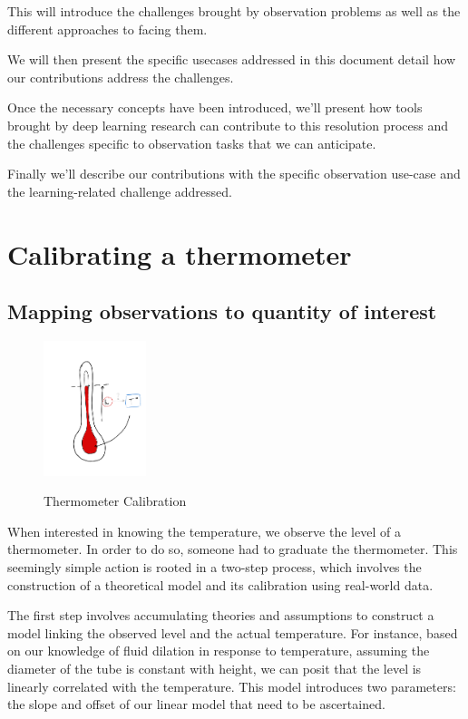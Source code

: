 \begin{bibunit}
  This will introduce the challenges brought by observation problems as well as the different approaches to facing them.

  We will then present the specific usecases addressed in this document detail how our contributions address the challenges.

  Once the necessary concepts have been introduced, we'll present how tools brought by deep learning research can contribute to this resolution process and the challenges specific to observation tasks that we can anticipate.

  Finally we'll describe our contributions with the specific observation use-case and the learning-related challenge addressed. 
  
  \section{Calibrating a thermometer}
\subsection{Mapping observations to quantity of interest}
\begin{figure}[h]
    \centering
        \includegraphics[clip, width=3cm]{Introduction/pics/therm_pb.png}     \\
    \caption{Thermometer Calibration}
    \label{fig:therm_calib}
\end{figure}


When interested in knowing the temperature, we observe the level of a thermometer.
In order to do so, someone had to graduate the thermometer. 
This seemingly simple action is rooted in a two-step process, which involves the construction of a theoretical model and its calibration using real-world data.

The first step involves accumulating theories and assumptions to construct a model linking the observed level and the actual temperature.
For instance, based on our knowledge of fluid dilation in response to temperature, assuming the diameter of the tube is constant with height, we can posit that the level is linearly correlated with the temperature.
This model introduces two parameters: the slope and offset of our linear model that need to be ascertained.


\end{bibunit}
